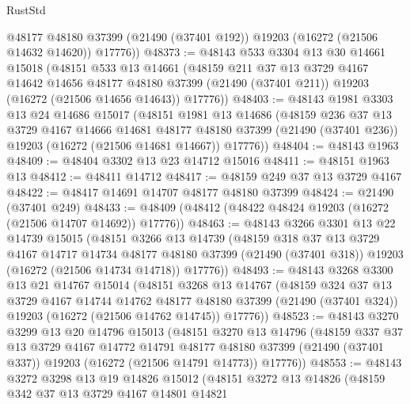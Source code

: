 \begin{lexlean}{RustStd}
\begin{coremodule}
        @48177
        @48180
        @37399
        (@21490 (@37401 @192))
        @19203
        (@16272 (@21506 @14632 @14620))
        @17776))
@48373 := @48143
    @533
    @3304
    @13
    @30
    @14661
    @15018
    (@48151
      @533
      @13
      @14661
      (@48159
        @211
        @37
        @13
        @3729
        @4167
        @14642
        @14656
        @48177
        @48180
        @37399
        (@21490 (@37401 @211))
        @19203
        (@16272 (@21506 @14656 @14643))
        @17776))
@48403 := @48143
    @1981
    @3303
    @13
    @24
    @14686
    @15017
    (@48151
      @1981
      @13
      @14686
      (@48159
        @236
        @37
        @13
        @3729
        @4167
        @14666
        @14681
        @48177
        @48180
        @37399
        (@21490 (@37401 @236))
        @19203
        (@16272 (@21506 @14681 @14667))
        @17776))
@48404 := @48143 @1963
@48409 := @48404 @3302 @13 @23 @14712 @15016
@48411 := @48151 @1963 @13
@48412 := @48411 @14712
@48417 := @48159 @249 @37 @13 @3729 @4167
@48422 := @48417 @14691 @14707 @48177 @48180 @37399
@48424 := @21490 (@37401 @249)
@48433 := @48409 (@48412 (@48422 @48424 @19203 (@16272 (@21506 @14707 @14692)) @17776))
@48463 := @48143
    @3266
    @3301
    @13
    @22
    @14739
    @15015
    (@48151
      @3266
      @13
      @14739
      (@48159
        @318
        @37
        @13
        @3729
        @4167
        @14717
        @14734
        @48177
        @48180
        @37399
        (@21490 (@37401 @318))
        @19203
        (@16272 (@21506 @14734 @14718))
        @17776))
@48493 := @48143
    @3268
    @3300
    @13
    @21
    @14767
    @15014
    (@48151
      @3268
      @13
      @14767
      (@48159
        @324
        @37
        @13
        @3729
        @4167
        @14744
        @14762
        @48177
        @48180
        @37399
        (@21490 (@37401 @324))
        @19203
        (@16272 (@21506 @14762 @14745))
        @17776))
@48523 := @48143
    @3270
    @3299
    @13
    @20
    @14796
    @15013
    (@48151
      @3270
      @13
      @14796
      (@48159
        @337
        @37
        @13
        @3729
        @4167
        @14772
        @14791
        @48177
        @48180
        @37399
        (@21490 (@37401 @337))
        @19203
        (@16272 (@21506 @14791 @14773))
        @17776))
@48553 := @48143
    @3272
    @3298
    @13
    @19
    @14826
    @15012
    (@48151
      @3272
      @13
      @14826
      (@48159
        @342
        @37
        @13
        @3729
        @4167
        @14801
        @14821

\end{coremodule}
\end{lexlean}
